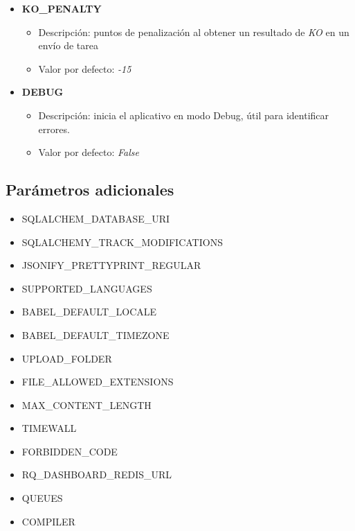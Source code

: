 \documentclass[11pt,spanish,listoffigures,listoftables]{tfgetsinf}
\begin{document}
\begin{itemize}
	\item \textbf{KO\_PENALTY}
	\begin{itemize}
		\item Descripción: puntos de penalización al obtener un resultado de \textit{KO} en un envío de \Gls{tarea}
		\item Valor por defecto: \textit{-15}
	\end{itemize}
\end{itemize}

\begin{itemize}
	\item \textbf{DEBUG}
	\begin{itemize}
		\item Descripción: inicia el aplicativo en modo Debug, útil para identificar errores.
		\item Valor por defecto: \textit{False}
	\end{itemize}
\end{itemize}

\subsection*{Parámetros adicionales}

\begin{itemize}
	\item SQLALCHEM\_DATABASE\_URI
	\item SQLALCHEMY\_TRACK\_MODIFICATIONS
	\item JSONIFY\_PRETTYPRINT\_REGULAR
	\item SUPPORTED\_LANGUAGES
	\item BABEL\_DEFAULT\_LOCALE
	\item BABEL\_DEFAULT\_TIMEZONE
	\item UPLOAD\_FOLDER
	\item FILE\_ALLOWED\_EXTENSIONS
	\item MAX\_CONTENT\_LENGTH
	\item TIMEWALL
	\item FORBIDDEN\_CODE
	\item RQ\_DASHBOARD\_REDIS\_URL
	\item QUEUES
	\item COMPILER
\end{itemize}

\glsaddall
\printglossary[title=Acrónimos,type=\acronymtype]

\glsaddall
\printglossary[title=Términos,toctitle=Terms and abbreviations]
\end{document}
